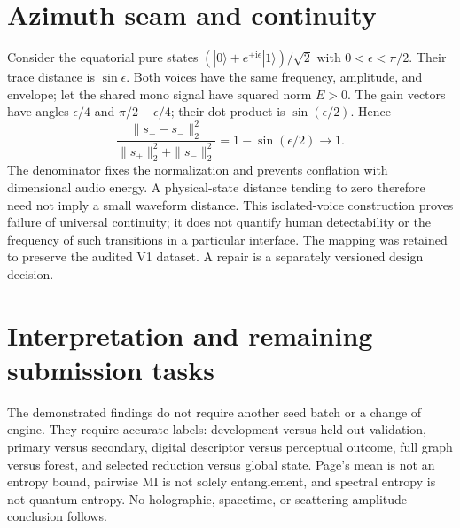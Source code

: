 \documentclass[11pt,a4paper]{article}
\begin{document}
\section{Azimuth seam and continuity}
Consider the equatorial pure states $(|0\rangle+e^{\pm\mathrm i\epsilon}|1\rangle)/\sqrt2$ with $0<\epsilon<\pi/2$. Their trace distance is $\sin\epsilon$. Both voices have the same frequency, amplitude, and envelope; let the shared mono signal have squared norm $E>0$. The gain vectors have angles $\epsilon/4$ and $\pi/2-\epsilon/4$; their dot product is $\sin(\epsilon/2)$. Hence
\[
\frac{\|s_+-s_-\|_2^2}{\|s_+\|_2^2+\|s_-\|_2^2}=1-\sin(\epsilon/2)\longrightarrow1.
\]
The denominator fixes the normalization and prevents conflation with dimensional audio energy. A physical-state distance tending to zero therefore need not imply a small waveform distance. This isolated-voice construction proves failure of universal continuity; it does not quantify human detectability or the frequency of such transitions in a particular interface. The mapping was retained to preserve the audited V1 dataset. A repair is a separately versioned design decision.

\section{Interpretation and remaining submission tasks}
The demonstrated findings do not require another seed batch or a change of engine. They require accurate labels: development versus held-out validation, primary versus secondary, digital descriptor versus perceptual outcome, full graph versus forest, and selected reduction versus global state. Page's mean is not an entropy bound, pairwise MI is not solely entanglement, and spectral entropy is not quantum entropy. No holographic, spacetime, or scattering-amplitude conclusion follows.
\end{document}
